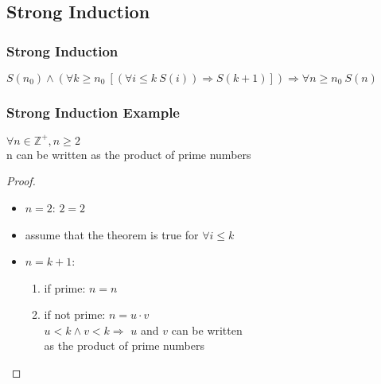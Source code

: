 \documentclass[dvipsnames]{beamer}
\begin{document}
\subsection{Strong Induction}

\begin{frame}
  \frametitle{Strong Induction}

  \begin{definition}
    $S(n_0) \wedge
      (\forall k \geq n_0~[(\forall i \leq k~S(i)) \Rightarrow S(k+1)])
      \Rightarrow \forall n \geq n_0~S(n)$
  \end{definition}
\end{frame}

\begin{frame}
  \frametitle{Strong Induction Example}

  \begin{theorem}
    $\forall n \in \mathbb{Z}^+, n \geq 2$\\
      n can be written as the product of prime numbers
  \end{theorem}

  \pause
  \begin{proof}
    \begin{itemize}
      \item $n=2$: $2=2$

      \pause
      \item assume that the theorem is true for $\forall i \leq k$

      \pause
      \item $n=k+1$:
      \begin{enumerate}
        \item if prime: $n=n$

        \pause
        \item if not prime: $n=u \cdot v$\\
          $u < k \wedge v < k \Rightarrow$ $u$ and $v$ can be written\\
          as the product of prime numbers
      \end{enumerate}
    \end{itemize}
  \end{proof}
\end{frame}
\end{document}

